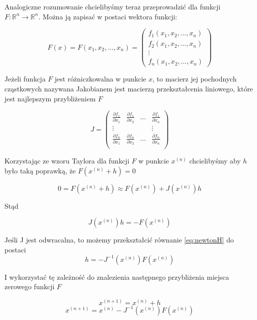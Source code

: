 \documentclass[11pt,wide]{mwart}
\begin{document}
Analogiczne rozumowanie chcielibyśmy teraz przeprowadzić dla funkcji $ F : \mathbb{R}^n \to \mathbb{R}^n $. Można ją zapisać w postaci wektora funkcji:

$$ 
F(x) = F(x_1, x_2, \ldots, x_n) = 
\left(\begin{matrix}
	f_1(x_1, x_2, \ldots, x_n) \\ 
	f_2(x_1, x_2, \ldots, x_n) \\ 
	\vdots\\ 
	f_n(x_1, x_2, \ldots, x_n)
\end{matrix}\right)
$$

\noindent Jeżeli funkcja $ F $ jest różniczkowalna w punkcie $ x $, to macierz jej pochodnych cząstkowych nazywana Jakobianem jest macierzą przekształcenia liniowego, które jest najlepszym przybliżeniem $ F $

$$ J = 
\begin{pmatrix}
\frac{\partial f_1}{\partial x_1} & \frac{\partial f_1}{\partial x_2} &  \ldots & \frac{\partial f_1}{\partial x_n} \\ 

 \vdots & & & \vdots  \\ 
\frac{\partial f_n}{\partial x_1} & \frac{\partial f_n}{\partial x_2} &  \ldots & \frac{\partial f_n}{\partial x_n} \\ 
\end{pmatrix}
$$

\noindent Korzystając ze wzoru Taylora dla funkcji $ F $ w punkcie $ x^{(n)} $ chcielibyśmy aby $ h$ było taką poprawką, że $ F(x^{(n)} + h) = 0 $

$$
 	0 = F(x^{(n)} + h) \approx F(x^{(n)}) + J(x^{(n)})h
$$

\noindent Stąd

\begin{equation} \label{eq:newtonH}
	J(x^{(n)})h = -F(x^{(n)})
\end{equation}

\noindent Jeśli J jest odwracalna, to możemy przekształcić równanie \eqref{eq:newtonH} do postaci
$$ 
	h = -J^{-1}(x^{(n)})F(x^{(n)}) 
$$

\noindent I wykorzystać tę zależność do znalezienia następnego przybliżenia miejsca zerowego funkcji $ F $

\begin{equation} \label{eq:newtonrec}
	x^{(n + 1)} = x^{(n)} + h
\end{equation}
\begin{equation*}
	x^{(n + 1)} = x^{(n)} - J^{-1}(x^{(n)})F(x^{(n)})
\end{equation*}
\end{document}
